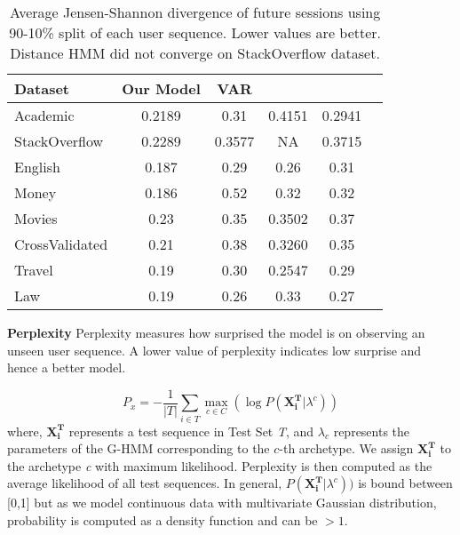 \begin{table}[tbh]
	\centering
{}
		\begin{tabular}{lSSSSS} \toprule
			Dataset                & {Our Model}& {VAR}& {} & {} \\ \midrule
			Academic               & 0.2189  &  0.31    &   0.4151  &  0.2941    \\
			{StackOverflow}       & 0.2289  &   0.3577  & NA  &  0.3715     \\
			{English}              & 0.187 & 0.29 &  0.26      & 0.31 \\
			Money                  & 0.186 & 0.52 &  0.32      & 0.32  \\
			Movies                 & 0.23  & 0.35 &  0.3502    & 0.37 \\
			CrossValidated         & 0.21  & 0.38 &  0.3260    & 0.35  \\
			Travel                 & 0.19  & 0.30 &  0.2547    & 0.29  \\
			Law                    & 0.19  & 0.26 &  0.33      & 0.27  \\ \bottomrule
		\end{tabular}
	\caption{\label{tab:futurepred} Average Jensen-Shannon divergence of future sessions using 90-10\% split of each user sequence. Lower values are better. Distance HMM did not converge on StackOverflow dataset.
   }
\end{table}

\textbf{Perplexity}
Perplexity measures how surprised the model is on observing an unseen user sequence. A lower value of perplexity indicates low surprise and hence a better model.

\begin{equation}
    P_x = - \frac{1}{ \textit{$|T|$} } \sum_{i \in T }  \max_{c \in C}  \left (\log P(\mathbf{X_i^T} | \lambda^{c}) \right )
\end{equation}
where, $\mathbf{X_i^T}$ represents a test sequence in Test Set \emph{T}, and $\lambda_c$ represents the parameters of the G-HMM corresponding to the $c$-th archetype. We assign $\mathbf{X_i^T}$ to the archetype \emph{c} with maximum likelihood. Perplexity is then computed as the average likelihood of all test sequences. In general, $P(\mathbf{X_i^T} | \lambda^{c}))$ is bound between [0,1] but as we model continuous data with multivariate Gaussian distribution, probability is computed as a density function and can be $>1$.

